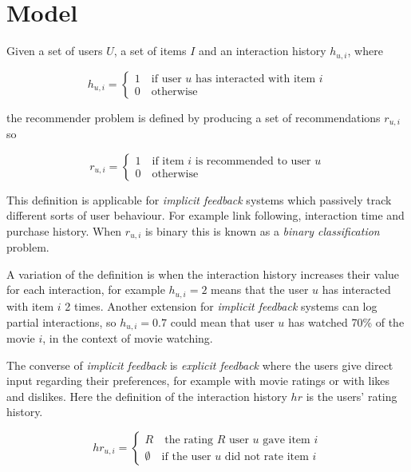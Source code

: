 
\section{Model}\label{sec:model}


Given a set of users $U$, a set of items $I$ and an interaction history $h_{u, i}$,  where

\begin{equation}\label{eq:hist}
    h_{u, i} = \begin{cases}
        1 \quad \text{if user $u$ has interacted with item $i$} \\
        0 \quad \text{otherwise}
    \end{cases}
\end{equation}

the recommender problem is defined by producing a set of recommendations $r_{u, i}$ so

\begin{equation}
    r_{u, i} = \begin{cases}
        1 \quad \text{if item $i$ is recommended to user $u$} \\
        0 \quad \text{otherwise}
    \end{cases}
\end{equation}

This definition is applicable for \textit{implicit feedback} systems which passively track different sorts of user behaviour. For example link following, interaction time and purchase history. When $r_{u, i}$ is binary this is known as a \textit{binary classification} problem.

A variation of the definition is when the interaction history increases their value for each interaction, for example $h_{u, i} = 2$ means that the user $u$ has interacted with item $i$ 2 times. Another extension for \textit{implicit feedback} systems can log partial interactions, so $h_{u, i} = 0.7$ could mean that user $u$ has watched 70\% of the movie $i$, in the context of movie watching. \citep{hu2008collaborative}

The converse of \textit{implicit feedback} is \textit{explicit feedback} where the users give direct input regarding their preferences, for example with movie ratings or with likes and dislikes.  Here the definition of the interaction history $hr$ is the users' rating history.

\begin{equation}
    hr_{u, i} = \begin{cases}
        R \quad \text{the rating $R$ user $u$ gave item $i$} \\
        \emptyset \quad \text{if the user $u$ did not rate item $i$}
    \end{cases}
\end{equation}

